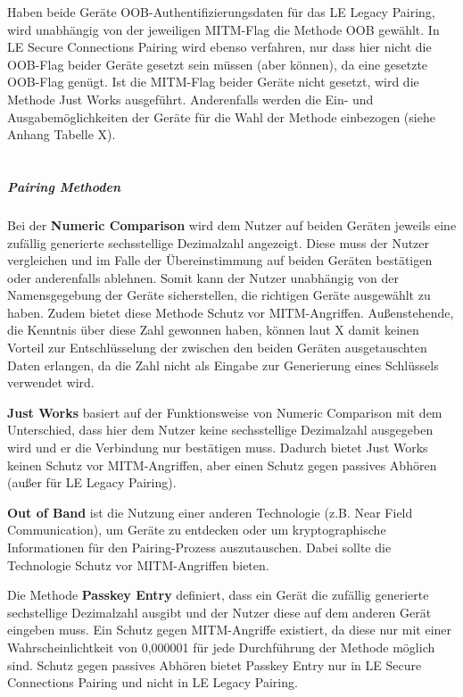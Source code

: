 Haben beide Geräte OOB-Authentifizierungsdaten für das LE Legacy Pairing, wird unabhängig von der jeweiligen MITM-Flag die Methode OOB gewählt. In LE Secure Connections Pairing wird ebenso verfahren, nur dass hier nicht die OOB-Flag beider Geräte gesetzt sein müssen (aber können), da eine gesetzte OOB-Flag genügt. Ist die MITM-Flag beider Geräte nicht gesetzt, wird die Methode Just Works ausgeführt. Anderenfalls werden die Ein- und Ausgabemöglichkeiten der Geräte für die Wahl der Methode einbezogen (siehe Anhang Tabelle X).\\\\



\subparagraph{Pairing Methoden}
Bei der \textbf{Numeric Comparison} wird dem Nutzer auf beiden Geräten jeweils eine zufällig generierte sechsstellige Dezimalzahl angezeigt. Diese muss der Nutzer vergleichen und im Falle der Übereinstimmung auf beiden Geräten bestätigen oder anderenfalls ablehnen. Somit kann der Nutzer unabhängig von der Namensgegebung der Geräte sicherstellen, die richtigen Geräte ausgewählt zu haben. Zudem bietet diese Methode Schutz vor MITM-Angriffen. Außenstehende, die Kenntnis über diese Zahl gewonnen haben, können laut X
damit keinen Vorteil zur Entschlüsselung der zwischen den beiden Geräten ausgetauschten Daten erlangen, da die Zahl nicht als Eingabe zur Generierung eines Schlüssels verwendet wird.

\textbf{Just Works} basiert auf der Funktionsweise von Numeric Comparison mit dem Unterschied, dass hier dem Nutzer keine sechsstellige Dezimalzahl ausgegeben wird und er die Verbindung nur bestätigen muss. Dadurch bietet Just Works keinen Schutz vor MITM-Angriffen, aber einen Schutz gegen passives Abhören (außer für LE Legacy Pairing).

\textbf{Out of Band} ist die Nutzung einer anderen Technologie (z.B. Near Field Communication), um Geräte zu entdecken oder um kryptographische Informationen für den Pairing-Prozess auszutauschen. Dabei sollte die Technologie Schutz vor MITM-Angriffen bieten.

Die Methode \textbf{Passkey Entry} definiert, dass ein Gerät die zufällig generierte sechstellige Dezimalzahl ausgibt und der Nutzer diese auf dem anderen Gerät eingeben muss. 
Ein Schutz gegen MITM-Angriffe existiert, da diese nur mit einer Wahrscheinlichtkeit von 0,000001 für jede Durchführung der Methode möglich sind. Schutz gegen passives Abhören bietet Passkey Entry nur in LE Secure Connections Pairing und nicht in LE Legacy Pairing.



